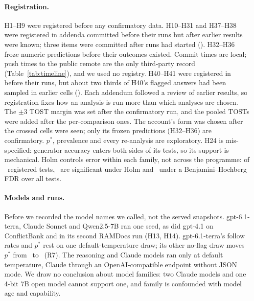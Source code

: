 \paragraph{Registration.} H1--H9 were registered before any confirmatory data. H10--H31 and H37--H38 were registered
in addenda committed before their runs but after earlier results were known; three items were committed after runs
had started (). H32--H36 froze numeric predictions before their outcomes existed. Commit times are local;
push times to the public remote are the only third-party record (Table~\ref{tab:timeline}), and we used no registry.
H40--H41 were registered in  before their runs, but about two thirds of H40's flagged answers had been sampled
in earlier cells (). Each addendum followed a review of earlier results, so registration fixes how an analysis is run more than which
analyses are chosen. The $\pm$3 TOST margin was set after the confirmatory run, and the pooled TOSTs were added after
the per-comparison ones. The account's form was chosen after the crossed cells were seen; only its frozen predictions (H32--H36) are
confirmatory. $p^*$, prevalence and every  re-analysis are exploratory. H24 is mis-specified: generator accuracy enters both sides of its tests, so its support is mechanical.
Holm controls error within each family, not across the programme: of \fdrN\ registered tests, \fdrHolm\ are
significant under Holm and \fdrBH\ under a Benjamini--Hochberg FDR over all tests.

\paragraph{Models and runs.} Before  we recorded the model names we called, not the served snapshots. gpt-6.1-terra, Claude Sonnet and Qwen2.5-7B ran one seed, as did gpt-4.1 on ConflictBank and in its second RAMDocs run
(H13, H14). gpt-6.1-terra's follow
rates and $p^*$ rest on one default-temperature draw; its other no-flag draw moves $p^*$ from \terraDrawRegBe\
to \terraDrawAltBe\ (R7). The reasoning and Claude models ran only at default temperature, Claude through an
OpenAI-compatible endpoint without JSON mode. We draw no conclusion about model families: two Claude models and one
4-bit 7B open model cannot support one, and family is confounded with model age and capability.

